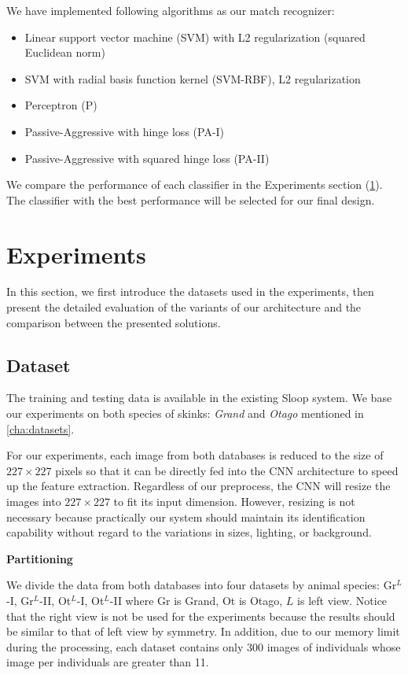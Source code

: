 We have implemented following algorithms as our match recognizer:
\begin{itemize}
  \item Linear support vector machine (SVM) with L2 regularization (squared
    Euclidean norm)
  \item SVM with radial basis function kernel (SVM-RBF), L2 regularization
  \item Perceptron (P)
  \item Passive-Aggressive with hinge loss (PA-I)
  \item Passive-Aggressive with squared hinge loss (PA-II)
\end{itemize}

We compare the performance of each classifier in the Experiments section
(\ref{experiments}). The classifier with the best performance will be selected
for our final design.

\section{Experiments}\label{experiments}

In this section, we first introduce the datasets used in the experiments, then
present the detailed evaluation of the variants of our architecture and the
comparison between the presented solutions.

\subsection{Dataset}

The training and testing data is available in the existing Sloop system. We
base our experiments on both species of skinks: \emph{Grand} and \emph{Otago}
mentioned in \ref{cha:datasets}.

For our experiments, each image from both databases is reduced to the size of
$227 \times 227$ pixels so that it can be directly fed into the CNN
architecture to speed up the feature extraction. Regardless of our preprocess,
the CNN will resize the images into $227 \times 227$ to fit its input
dimension. However, resizing is not necessary because practically our system
should maintain its identification capability without regard to the variations
in sizes, lighting, or background.

\textbf{Partitioning}

We divide the data from both databases into four datasets by animal species:
Gr$^{L}$-I, Gr$^{L}$-II, Ot$^{L}$-I, Ot$^{L}$-II where Gr is Grand, Ot is
Otago, $L$ is left view. Notice that the right view is not be used for the
experiments because the results should be similar to that of left view by
symmetry. In addition, due to our memory limit during the processing, each
dataset contains only 300 images of individuals whose image per individuals are
greater than 11.

